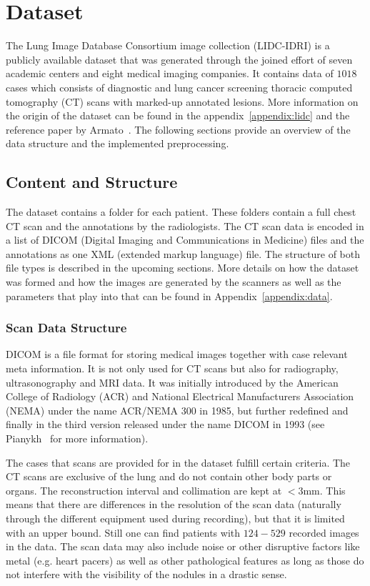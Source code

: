 \documentclass[../Thesis.tex]{subfiles}
\begin{document}
\chapter{Dataset}\label{chap:data}
The Lung Image Database Consortium image collection (LIDC-IDRI) is a publicly available dataset that was generated through the joined effort of seven academic centers and eight medical imaging companies. It contains data of $1018$ cases which consists of diagnostic and lung cancer screening thoracic computed tomography (CT) scans with marked-up annotated lesions. More information on the origin of the dataset can be found in the appendix~\ref{appendix:lidc} and the reference paper by Armato~\cite{armato2011lung}. The following sections provide an overview of the data structure and the implemented preprocessing.

\section{Content and Structure}
The dataset contains a folder for each patient. These folders contain a full chest CT scan and the annotations by the radiologists. The CT scan data is encoded in a list of DICOM (Digital Imaging and Communications in Medicine) files and the annotations as one XML (extended markup language) file. The structure of both file types is described in the upcoming sections. More details on how the dataset was formed and how the images are generated by the scanners as well as the parameters that play into that can be found in Appendix~\ref{appendix:data}.

\subsection{Scan Data Structure}
DICOM is a file format for storing medical images together with case relevant meta information. It is not only used for CT scans but also for radiography, ultrasonography and MRI data. It was initially introduced by the American College of Radiology (ACR) and National Electrical Manufacturers Association (NEMA) under the name ACR/NEMA 300 in 1985, but further redefined and finally in the third version released under the name DICOM in 1993 (see Pianykh~\cite{pianykh2008} for more information).

The cases that scans are provided for in the dataset fulfill certain criteria. The CT scans are exclusive of the lung and do not contain other body parts or organs. The reconstruction interval and collimation are kept at $<3$mm. This means that there are differences in the resolution of the scan data (naturally through the different equipment used during recording), but that it is limited with an upper bound. Still one can find patients with $124-529$ recorded images in the data. The scan data may also include noise or other disruptive factors like metal (e.g. heart pacers) as well as other pathological features as long as those do not interfere with the visibility of the nodules in a drastic sense.
\end{document}
